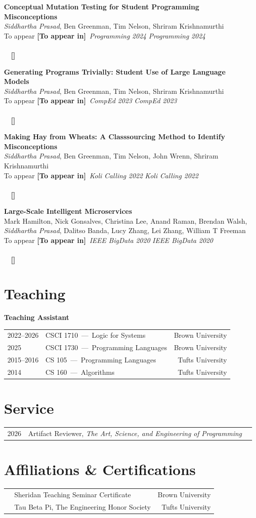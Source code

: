 \documentclass[10pt,letterpaper]{article}
\makeatletter
\newcommand{\pub}[5]{%
  \par\vspace{6pt}\noindent
  \textbf{#2}\\
  #3\\
  \def\@pubaward{#5}\def\@pubtoappear{To appear}%
  \ifx\@pubaward\@pubtoappear
    {\color{accent}\textbf{[To appear in]}}\ \textit{#4 #1}%
  \else
    \textit{#4 #1}\ifx\\#5\\\else\ \ {\color{accent}\textbf{[#5]}}\fi
  \fi
  \par}
\newcommand{\course}[3]{{\color{muted}#1} & #2 & {\color{muted}#3} \\}
\newenvironment{courselist}{%
  \par\vspace{1pt}\noindent
  \begin{tabular*}{\linewidth}{@{}l@{\hspace{1.5em}}l@{\extracolsep{\fill}}r@{}}}%
  {\end{tabular*}\par}
\newcommand{\me}{{\color{accent}\emph{Siddhartha Prasad}}}
\makeatother
\begin{document}
\pub{2024}{Conceptual Mutation Testing for Student Programming Misconceptions}%
  {\me, Ben Greenman, Tim Nelson, Shriram Krishnamurthi}%
  {Programming}{}

\pub{2023}{Generating Programs Trivially: Student Use of Large Language Models}%
  {\me, Ben Greenman, Tim Nelson, Shriram Krishnamurthi}%
  {CompEd}{}

\pub{2022}{Making Hay from Wheats: A Classsourcing Method to Identify Misconceptions}%
  {\me, Ben Greenman, Tim Nelson, John Wrenn, Shriram Krishnamurthi}%
  {Koli Calling}{}

\pub{2020}{Large-Scale Intelligent Microservices}%
  {Mark Hamilton, Nick Gonsalves, Christina Lee, Anand Raman, Brendan Walsh, \me, Dalitso Banda, Lucy Zhang, Lei Zhang, William T Freeman}%
  {IEEE BigData}{}

\section*{Teaching}

\noindent\textbf{Teaching Assistant}
\begin{courselist}
\course{2022--2026}{CSCI 1710 \,---\, Logic for Systems}{Brown University}
\course{2025}{CSCI 1730 \,---\, Programming Languages}{Brown University}
\course{2015--2016}{CS 105 \,---\, Programming Languages}{Tufts University}
\course{2014}{CS 160 \,---\, Algorithms}{Tufts University}
\end{courselist}

\section*{Service}

\begin{courselist}
\course{2026}{Artifact Reviewer, \textit{The Art, Science, and Engineering of Programming}}{}
\end{courselist}

\section*{Affiliations \& Certifications}

\begin{courselist}
\course{}{Sheridan Teaching Seminar Certificate}{Brown University}
\course{}{Tau Beta Pi, The Engineering Honor Society}{Tufts University}
\end{courselist}
\end{document}
